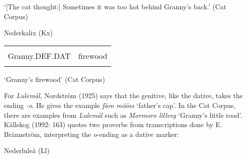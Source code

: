 \begin{styleTranslation}
‘[The cat thought:] Sometimes it was too hot behind Granny’s back.’ (Cat Corpus)

\end{styleTranslation}

\begin{listWWNumileveli}
\item {}

\begin{styleExample}
Nederkalix (Kx)

\end{styleExample}

\end{listWWNumileveli}

\begin{tabular}{ll}
\lsptoprule
\multicolumn{2}{l}{mårmorn

}\\
Granny.DEF.DAT & firewood\\
\lspbottomrule
\end{tabular}

\begin{styleTranslation}
‘Granny’s firewood’  (Cat Corpus)

\end{styleTranslation}

\begin{styleBodyTextFirst}
For \textit{Lulemål}, Nordström (1925) says that the genitive, like the dative, takes the ending\textit{ -o}. He gives the example \textit{färo mööss} ‘father’s cap’. In the Cat Corpus, there are examples from \textit{Lulemål} such as \textit{Mormoro lillveg} ‘Granny’s little road’.  Källskog (1992: 163) quotes two proverbs from transcriptions done by E. Brännström, interpreting the \textit{o}{}-ending as a dative marker: 

\end{styleBodyTextFirst}

\begin{listWWNumileveli}
\item {}

\begin{styleExample}
Nederluleå (Ll)

\end{styleExample}

\end{listWWNumileveli}

\begin{listWWNumlxxiiileveli}
\item {}

\end{listWWNumlxxiiileveli}

